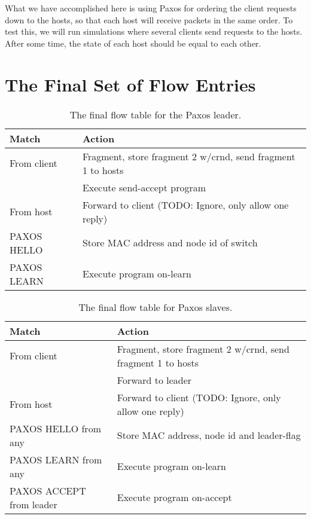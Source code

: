What we have accomplished here is using Paxos for
ordering the client
requests down to the hosts, so that each host will receive packets in the
same order.  To test this, we will run simulations where several clients
send requests to the hosts. After some time, the state of each host should
be equal to each other.

\section{The Final Set of Flow Entries}
\label{chapter:final.flowtable}



\begin{table}[H]
  \centering
  \begin{tabular}{|l|l|}
    \hline \textbf{Match} & \textbf{Action} \\
    \hline From client & Fragment, store fragment 2 w/crnd, send fragment 1 to hosts \\
                       & Execute send-accept program \\
    \hline From host & Forward to client (TODO: Ignore, only allow one reply) \\
    \hline PAXOS HELLO & Store MAC address and node id of switch \\
    \hline PAXOS LEARN & Execute program on-learn \\
    \hline
  \end{tabular}
  \caption{The final flow table for the Paxos leader.}
  \label{table:complete.match.leader}
\end{table}

\begin{table}[H]
  \centering
  \begin{tabular}{|l|l|}
    \hline \textbf{Match} & \textbf{Action} \\
    \hline From client & Fragment, store fragment 2 w/crnd, send fragment 1 to hosts \\
                       & Forward to leader \\
    \hline From host & Forward to client (TODO: Ignore, only allow one reply) \\
    \hline PAXOS HELLO from any & Store MAC address, node id and leader-flag \\
    \hline PAXOS LEARN from any & Execute program on-learn \\
    \hline PAXOS ACCEPT from leader & Execute program on-accept \\
    \hline
  \end{tabular}
  \caption{The final flow table for Paxos slaves.}
  \label{table:complete.match.slave}
\end{table}

